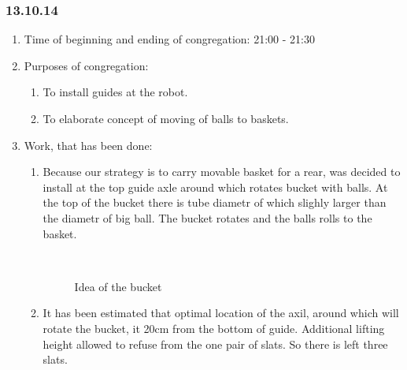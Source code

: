 
\subsubsection{13.10.14}

\begin{enumerate}
	\item Time of beginning and ending of congregation:
	21:00 - 21:30
	\item Purposes of congregation:
	\begin{enumerate}
	  \item To install guides at the robot.
	  
	  \item To elaborate concept of moving of balls to baskets.
	  
    \end{enumerate}
	\item Work, that has been done:
	\begin{enumerate}
	  \item Because our strategy is to carry movable basket for a rear, was decided to install at the top guide axle around which rotates bucket with balls. At the top of the bucket there is tube diametr of which slighly larger than the diametr of big ball. The bucket rotates and the balls rolls to the basket.
	  \begin{figure}[H]
	  	\begin{minipage}[h]{0.2\linewidth}
	  		\center  
	  	\end{minipage}
	  	\begin{minipage}[h]{0.6\linewidth}
	  		\caption{Idea of the bucket}
	  	\end{minipage}
	  \end{figure}
      
      \item It has been estimated that optimal location of the axil, around which will rotate the bucket, it 20cm from the bottom of guide. Additional lifting height allowed to refuse from the one pair of slats. So there is left three slats.
      

\end{enumerate}
\end{enumerate}

